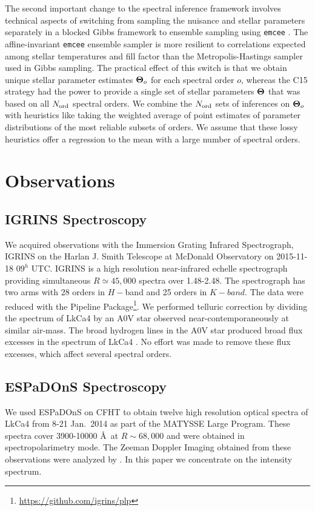 \documentclass[twocolumn]{emulateapj}%
\newcommand{\iancze}{{\sc C15 }}
\newcommand{\name}{LkCa4 }
\begin{document}
The second important change to the spectral inference framework involves technical aspects of switching from sampling the nuisance and stellar parameters separately in a blocked Gibbs framework to ensemble sampling using \texttt{emcee} \citep{foreman13}.  The affine-invariant \texttt{emcee} ensemble sampler is more resilient to correlations expected among stellar temperatures and fill factor than the Metropolis-Hastings sampler used in Gibbs sampling.  The practical effect of this switch is that we obtain unique stellar parameter estimates ${\bm \Theta}_{o}$ for each spectral order $o$, whereas the \iancze strategy had the power to provide a single set of stellar parameters ${\bm \Theta}$ that was based on all $N_{\rm ord}$ spectral orders.  We combine the $N_{\rm ord}$ sets of inferences on ${\bm \Theta}_{o}$ with heuristics like taking the weighted average of point estimates of parameter distributions of the most reliable subsets of orders.  We assume that these lossy heuristics offer a regression to the mean with a large number of spectral orders.


\section{Observations}\label{sec:obs} 

\subsection{IGRINS Spectroscopy}\label{sec:igrins} 
We acquired observations with the Immersion Grating Infrared Spectrograph, IGRINS \citep{park14,gully12} on the Harlan J. Smith Telescope at McDonald Observatory on 2015-11-18 $09^h$ UTC.  IGRINS is a high resolution near-infrared echelle spectrograph providing simultaneous $R\simeq45,000$ spectra over 1.48-2.48\um.  The spectrograph has two arms with 28 orders in $H-$band and 25 orders in $K-band$.  The data were reduced with the Pipeline Package\footnote{\url{https://github.com/igrins/plp}}.  We performed telluric correction by dividing the spectrum of \name by an A0V star observed near-contemporaneously at similar air-mass.  The broad hydrogen lines in the A0V star produced broad flux excesses in the spectrum of \name.  No effort was made to remove these flux excesses, which affect several spectral orders. 

\subsection{ESPaDOnS Spectroscopy}
We used ESPaDOnS on CFHT to obtain twelve high resolution optical spectra of \name from 8-21 Jan.~2014 as part of the MATYSSE Large Program.  These spectra cover 3900-10000 \AA\ at $R\sim68,000$ and were obtained in spectropolarimetry mode.  The Zeeman Doppler Imaging obtained from these observations were analyzed by \citet{donati14}.  In this paper we concentrate on the intensity spectrum.
\end{document}
